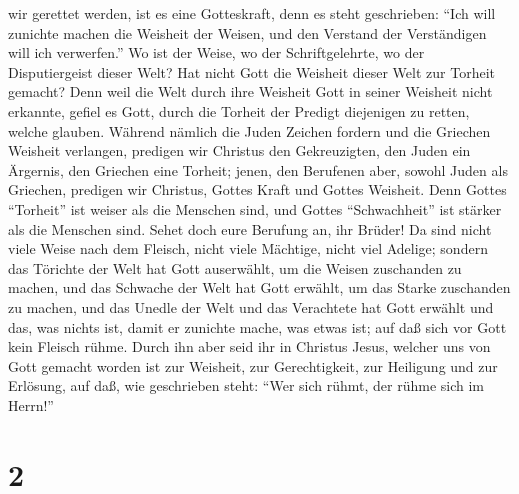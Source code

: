 wir gerettet werden, ist es eine Gotteskraft,  denn es
steht geschrieben: ``Ich will zunichte machen die Weisheit der Weisen,
und den Verstand der Verständigen will ich verwerfen.'' 
Wo ist der Weise, wo der Schriftgelehrte, wo der Disputiergeist dieser
Welt? Hat nicht Gott die Weisheit dieser Welt zur Torheit gemacht?
 Denn weil die Welt durch ihre Weisheit Gott in seiner
Weisheit nicht erkannte, gefiel es Gott, durch die Torheit der Predigt
diejenigen zu retten, welche glauben.  Während nämlich
die Juden Zeichen fordern und die Griechen Weisheit verlangen,
 predigen wir Christus den Gekreuzigten, den Juden ein
Ärgernis, den Griechen eine Torheit;  jenen, den
Berufenen aber, sowohl Juden als Griechen, predigen wir Christus, Gottes
Kraft und Gottes Weisheit.  Denn Gottes ``Torheit'' ist
weiser als die Menschen sind, und Gottes ``Schwachheit'' ist stärker als
die Menschen sind.  Sehet doch eure Berufung an, ihr
Brüder! Da sind nicht viele Weise nach dem Fleisch, nicht viele
Mächtige, nicht viel Adelige;  sondern das Törichte der
Welt hat Gott auserwählt, um die Weisen zuschanden zu machen, und das
Schwache der Welt hat Gott erwählt, um das Starke zuschanden zu machen,
 und das Unedle der Welt und das Verachtete hat Gott
erwählt und das, was nichts ist, damit er zunichte mache, was etwas ist;
 auf daß sich vor Gott kein Fleisch rühme.
 Durch ihn aber seid ihr in Christus Jesus, welcher uns
von Gott gemacht worden ist zur Weisheit, zur Gerechtigkeit, zur
Heiligung und zur Erlösung,  auf daß, wie geschrieben
steht: ``Wer sich rühmt, der rühme sich im Herrn!''

\hypertarget{section-1}{%
\section{2}\label{section-1}}

